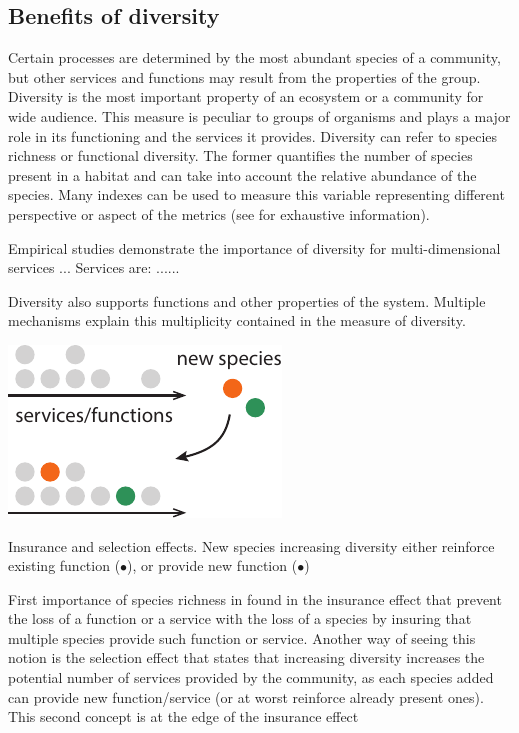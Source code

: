 \subsection{Benefits of diversity}

Certain processes are determined by the most abundant species of a community, but other services and functions may result from the properties of the group. Diversity is the most important property of an ecosystem or a community for wide audience. This measure is peculiar to groups of organisms and plays a major role in its functioning and the services it provides. Diversity can refer to species richness or functional diversity. The former quantifies the number of species present in a habitat and can take into account the relative abundance of the species. Many indexes can be used to measure this variable representing different perspective or aspect of the metrics (see \cite{chalmandrier_communities_2015} for exhaustive information).

Empirical studies demonstrate the importance of diversity for multi-dimensional services ... Services are: ......

Diversity also supports functions and other properties of the system. Multiple mechanisms explain this multiplicity contained in the measure of diversity. 


\begin{marginfigure}
    \includegraphics{./Figures/insurance_m.pdf}
  \caption[Diversity insurance effect]{Insurance and selection effects. New species increasing diversity either reinforce existing function (\textcolor{myOrange}{$\bullet$}), or provide new function (\textcolor{myGreen}{$\bullet$})}
  \label{fig:insurance}
\end{marginfigure}


First importance of species richness in found in the insurance effect that prevent the loss of a function or a service with the loss of a species by insuring that multiple species provide such function or service. Another way of seeing this notion is the selection effect that states that increasing diversity increases the potential number of services provided by the community, as each species added can provide new function/service (or at worst reinforce already present ones). This second concept is at the edge of the insurance effect

